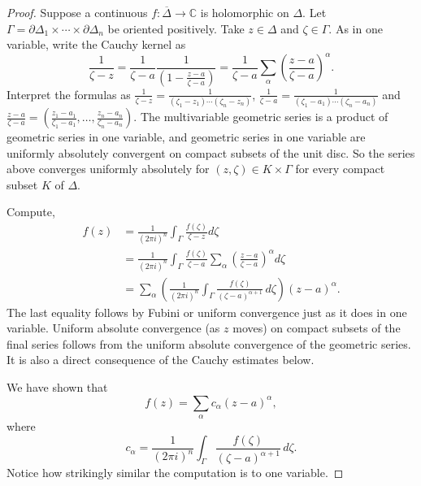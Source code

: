 \documentclass[12pt,openany]{book}
\newcommand{\C}{{\mathbb{C}}}
\theoremstyle{plain}
\theoremstyle{remark}
\theoremstyle{definition}
\theoremstyle{exercise}
\theoremstyle{example}
\begin{document}
\begin{proof}
Suppose a continuous $f \colon \overline{\Delta} \to \C$ is holomorphic on $\Delta$.
Let
$\Gamma = \partial \Delta_1 \times \cdots \times \partial \Delta_n$
be oriented positively.
Take $z \in \Delta$ and $\zeta \in \Gamma$.
As in one variable, write the Cauchy kernel as
\begin{equation*}
\frac{1}{\zeta-z} =
\frac{1}{\zeta-a}\frac{1}{\left(1-\frac{z-a}{\zeta-a}\right)} =
\frac{1}{\zeta-a}
\sum_{\alpha}
{\left(\frac{z-a}{\zeta-a}\right)}^\alpha .
\end{equation*}
Interpret the formulas as
$\frac{1}{\zeta-z} = \frac{1}{(\zeta_1-z_1) \cdots (\zeta_n-z_n)}$,
$\frac{1}{\zeta-a} = \frac{1}{(\zeta_1-a_1) \cdots (\zeta_n-a_n)}$
and
$\frac{z-a}{\zeta-a} =
\left(
\frac{z_1-a_1}{\zeta_1-a_1}, \ldots,
\frac{z_n-a_n}{\zeta_n-a_n}
\right)$.
The multivariable geometric series is a product of geometric series
in one variable, and geometric series in one variable
are uniformly absolutely convergent on compact subsets of the unit disc.
So the series
above converges uniformly absolutely for $(z,\zeta) \in K \times \Gamma$ 
for every compact subset $K$ of $\Delta$.

Compute,
\begin{equation*}
\begin{split}
f(z)
& =
\frac{1}{{(2\pi i)}^n}
\int_{\Gamma}
\frac{f(\zeta)}{\zeta-z}
d \zeta 
\\
& =
\frac{1}{{(2\pi i)}^n}
\int_{\Gamma}
\frac{f(\zeta)}{\zeta-a}
\sum_{\alpha}
{\left(\frac{z-a}{\zeta-a}\right)}^{\alpha}
d \zeta 
\\
& =
\sum_{\alpha}
\left(
\frac{1}{{(2\pi i)}^n}
\int_{\Gamma}
\frac{f(\zeta)}{{(\zeta-a)}^{\alpha+1}}
\,
d \zeta 
\right)
{(z-a)}^{\alpha} .
\end{split}
\end{equation*}
The last equality follows by Fubini or uniform convergence just as it does in one variable.
Uniform absolute convergence (as $z$ moves) on compact subsets of the final
series follows from the
uniform absolute convergence of the geometric series.  It is also a direct
consequence of the Cauchy estimates below.

We have shown that
\begin{equation*}
f(z) =
\sum_{\alpha}
c_{\alpha}
{(z-a)}^{\alpha} ,
\end{equation*}
where
\begin{equation*}
c_\alpha
=
\frac{1}{{(2\pi i)}^n}
\int_{\Gamma}
\frac{f(\zeta)}{{(\zeta-a)}^{\alpha+1}}
\,
d \zeta .
\end{equation*}
Notice how strikingly similar the computation is to one variable.


\end{proof}
\end{document}
